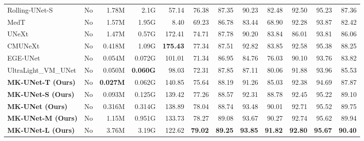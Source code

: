 \begin{table}[t]
\begin{center}
\begin{adjustbox}{width=0.88\textwidth}
\begin{tabular}{l|c|r|r|r|r|r|rr|rr|r}
Rolling-UNet-S \cite{liu2024rolling} & No & 1.78M &  2.1G & 57.14 & 76.38 &  87.35 & 90.23 & 82.48 & 92.50 & 95.23 & 87.36\\
MedT \cite{valanarasu2021medical} & No & 1.57M & 1.95G & 8.40 & 69.23 & 86.78 & 83.44 & 68.90 & 92.28 & 93.87 & 82.42 \\
UNeXt \cite{valanarasu2022unext} & No & 1.47M & 0.57G & 172.41 & 74.71 & 87.78 & 90.20 & 83.84 & 86.01 & 93.81 & 86.06 \\
CMUNeXt \cite{tang2023cmunext} & No & 0.418M & 1.09G & \textbf{175.43} & 77.34 & 87.51 & 92.82 & 83.85 & 92.58 & 95.38 & 88.25 \\
EGE-UNet \cite{ruan2023ege} & No &  0.054M &  0.072G & 101.01 & 71.34 &  86.95 & 84.76 & 76.03 & 90.10 & 93.76 & 83.82 \\
UltraLight\_VM\_UNet \cite{wu2024ultralight} & No & 0.050M & \textbf{0.060G} & 98.03 & 72.31 & 87.85  & 87.11  & 80.06 & 91.88 & 93.96 & 85.53 \\
\midrule
\textbf{MK-UNet-T (Ours)} & No & \textbf{0.027M} & 0.062G & 140.85 & 75.64 & 88.19 & 91.26 & 85.03 & 92.38 & 94.69 &  87.87 \\
\textbf{MK-UNet-S (Ours)} & No & 0.093M & 0.125G & 139.42 & 77.26 & 88.57 & 92.31 & 88.78 & 92.45 & 95.22 &  89.10 \\
\textbf{MK-UNet (Ours)} & No & 0.316M & 0.314G & 138.89 & 78.04 & 88.74 & 93.48 & 90.01 & 92.71 & 95.52 &  89.75 \\
\textbf{MK-UNet-M (Ours)}    & No  & 1.15M  & 0.951G &  133.73 & 78.27 & 89.08 & 93.67 & 90.27 & 92.74 & 95.62 & 89.94 \\
\textbf{MK-UNet-L (Ours)}    & No    & 3.76M & 3.19G &  122.62 & \textbf{79.02} & \textbf{89.25} & \textbf{93.85} & \textbf{91.82} & \textbf{92.80} & \textbf{95.67} & \textbf{90.40} \\


\end{tabular}
\end{adjustbox}
\end{center}
\end{table}
